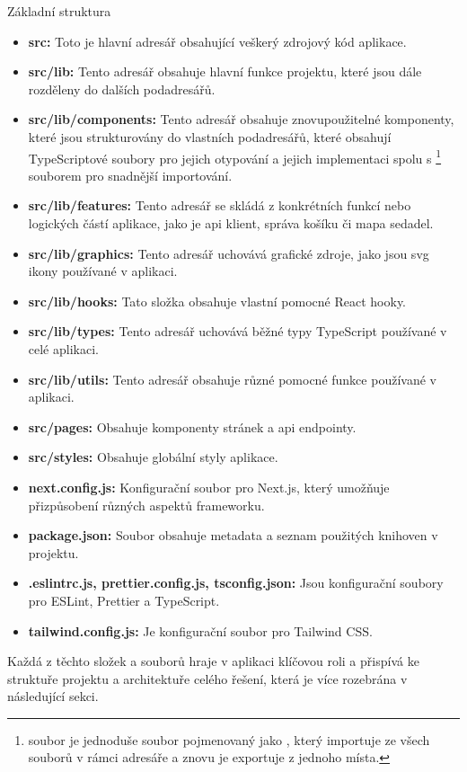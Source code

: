 \begin{subsection}{Základní struktura}
    \begin{itemize}
        \item \textbf{src:} Toto je hlavní adresář obsahující veškerý zdrojový kód aplikace.
        \item \textbf{src/lib:} Tento adresář obsahuje hlavní funkce projektu, které jsou dále rozděleny do dalších podadresářů.
        \item \textbf{src/lib/components:} Tento adresář obsahuje znovupoužitelné komponenty, které jsou strukturovány do vlastních podadresářů, které obsahují TypeScriptové soubory pro jejich otypování a jejich implementaci spolu s \footnote{ soubor je jednoduše soubor pojmenovaný jako , který importuje ze všech souborů v rámci adresáře a znovu je exportuje z jednoho místa.} souborem pro snadnější importování.
        \item \textbf{src/lib/features:} Tento adresář se skládá z konkrétních funkcí nebo logických částí aplikace, jako je \ac{api} klient, správa košíku či mapa sedadel.
        \item \textbf{src/lib/graphics:} Tento adresář uchovává grafické zdroje, jako jsou \ac{svg} ikony používané v aplikaci.
        \item \textbf{src/lib/hooks:} Tato složka obsahuje vlastní pomocné React hooky.
        \item \textbf{src/lib/types:} Tento adresář uchovává běžné typy TypeScript používané v celé aplikaci.
        \item \textbf{src/lib/utils:} Tento adresář obsahuje různé pomocné funkce používané v aplikaci.
        \item \textbf{src/pages:} Obsahuje komponenty stránek a \ac{api} endpointy.
        \item \textbf{src/styles:} Obsahuje globální styly aplikace.
        \item \textbf{next.config.js:} Konfigurační soubor pro Next.js, který umožňuje přizpůsobení různých aspektů frameworku.
        \item \textbf{package.json:} Soubor obsahuje metadata a seznam použitých knihoven v projektu.
        \item \textbf{.eslintrc.js, prettier.config.js, tsconfig.json:} Jsou konfigurační soubory pro ESLint, Prettier a TypeScript.
        \item \textbf{tailwind.config.js:} Je konfigurační soubor pro Tailwind CSS\@.
    \end{itemize}

    Každá z těchto složek a souborů hraje v aplikaci klíčovou roli a přispívá ke struktuře projektu a architektuře celého řešení, která je více rozebrána v následující sekci.
\end{subsection}
\pagebreak

